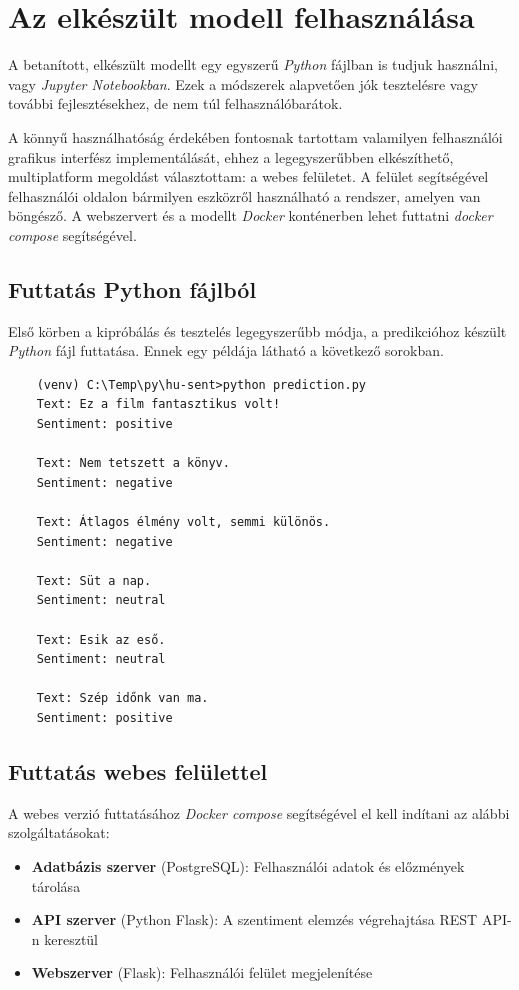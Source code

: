 \documentclass[12pt]{article}
\begin{document}
\section{Az elkészült modell felhasználása}

A betanított, elkészült modellt egy egyszerű \textit{Python} fájlban is tudjuk használni, vagy \textit{Jupyter Notebookban}. Ezek a módszerek alapvetően jók tesztelésre vagy további fejlesztésekhez, de nem túl felhasználóbarátok.

A könnyű használhatóság érdekében fontosnak tartottam valamilyen felhasználói grafikus interfész implementálását, ehhez a legegyszerűbben elkészíthető, multiplatform megoldást választottam: a webes felületet. A felület segítségével felhasználói oldalon bármilyen eszközről használható a rendszer, amelyen van böngésző. A webszervert és a modellt \textit{Docker} konténerben lehet futtatni \textit{docker compose} segítségével.

\subsection{Futtatás Python fájlból}

Első körben a kipróbálás és tesztelés legegyszerűbb módja, a predikcióhoz készült \textit{Python} fájl futtatása. Ennek egy példája látható a következő sorokban.

\begin{verbatim}
    (venv) C:\Temp\py\hu-sent>python prediction.py
    Text: Ez a film fantasztikus volt!
    Sentiment: positive
    
    Text: Nem tetszett a könyv.
    Sentiment: negative
    
    Text: Átlagos élmény volt, semmi különös.
    Sentiment: negative
    
    Text: Süt a nap.
    Sentiment: neutral
    
    Text: Esik az eső.
    Sentiment: neutral
    
    Text: Szép időnk van ma.
    Sentiment: positive
\end{verbatim}

\subsection{Futtatás webes felülettel}

A webes verzió futtatásához \textit{Docker compose} segítségével el kell indítani az alábbi szolgáltatásokat:

\begin{itemize}
    \item \textbf{Adatbázis szerver} (PostgreSQL): Felhasználói adatok és előzmények tárolása
    \item \textbf{API szerver} (Python Flask): A szentiment elemzés végrehajtása REST API-n keresztül
    \item \textbf{Webszerver} (Flask): Felhasználói felület megjelenítése
\end{itemize}
\end{document}
